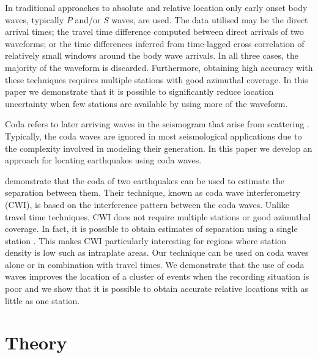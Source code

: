 \documentclass[extra]{gji}
\begin{document}
In traditional approaches to absolute and relative location
only early onset body waves, typically $P$ and/or $S$ waves, are used.
The data utilised may be the direct arrival times; the travel time difference computed
between direct arrivals of two waveforms; or the time differences
inferred from time-lagged cross correlation of relatively small windows
around the body wave arrivals.
 In all three cases, the majority of the
waveform is discarded. Furthermore, obtaining high accuracy with these techniques
requires multiple stations with good azimuthal coverage.
In this paper we demonstrate that it is possible to
significantly reduce location uncertainty when few stations are
available by using more of the waveform.

Coda refers to  later arriving waves in the seismogram that arise from
scattering  \citep{dr_Aki69a,dr_Snieder99a,dr_Snieder06a}.
Typically, the coda waves are ignored in most seismological
applications due to the complexity involved in modeling their
generation. In this
paper we develop an approach for locating earthquakes using coda waves.

\citet{dr_Snieder05a} demonstrate that the coda of two earthquakes
can be used to estimate the separation between them. Their
technique, known as coda wave interferometry (CWI), is based on the
interference pattern between the coda waves. Unlike travel time
techniques, CWI
 does not require multiple stations or good azimuthal coverage.
In fact, it is possible to obtain estimates of separation using a single
station \citep{dr_Robinson07b}. This makes CWI particularly interesting
for regions where station density is low such as intraplate areas.
Our technique can be used on coda waves alone or in combination with
travel times. We demonstrate that the use of coda waves improves
the location of a cluster of events when the recording situation
is poor and we show that it is possible to obtain accurate relative locations with as
little as one station.

\section{Theory}
\label{sec:theory}
\end{document}

